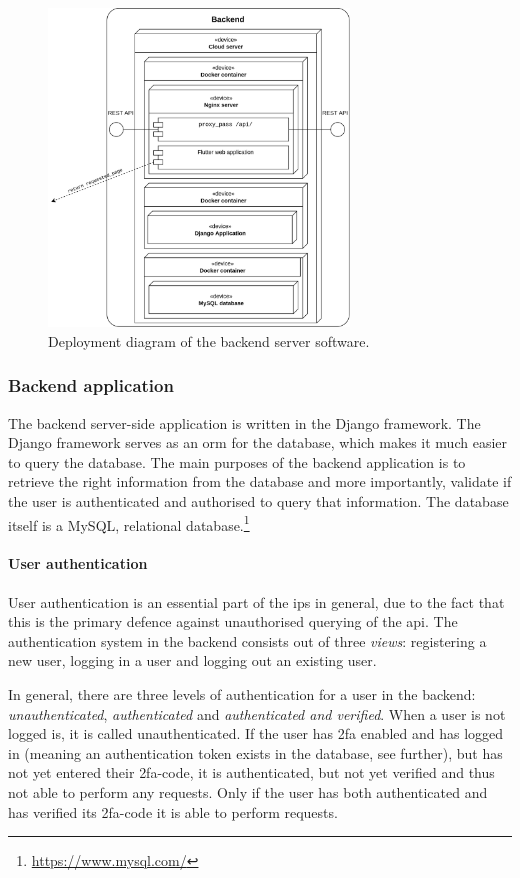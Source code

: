 \begin{figure}[htp]
    \centering
    \includegraphics[width=8cm]{images/deployment_diagrams/deployment_diagram-backend.drawio.png}
    \caption{Deployment diagram of the backend server software.}
    \label{fig:deployment-backend}
\end{figure}


\subsubsection{Backend application}\label{sec:backend-application}
The backend server-side application is written in the Django framework. The Django framework serves as an \ac{orm} for the database, which makes it much easier to query the database. The main purposes of the backend application is to retrieve the right information from the database and more importantly, validate if the user is authenticated and authorised to query that information. The database itself is a MySQL, relational database.\footnote{\url{https://www.mysql.com/}} 


\paragraph{User authentication}\label{sec:user-authentication}
User authentication is an essential part of the \ac{ips} in general, due to the fact that this is the primary defence against unauthorised querying of the \ac{api}. The authentication system in the backend consists out of three \textit{views}: registering a new user, logging in a user and logging out an existing user. 

\ind In general, there are three levels of authentication for a user in the backend: \textit{unauthenticated}, \textit{authenticated} and \textit{authenticated and verified}. When a user is not logged is, it is called unauthenticated. If the user has \ac{2fa} enabled and has logged in (meaning an authentication token exists in the database, see further), but has not yet entered their \ac{2fa}-code, it is authenticated, but not yet verified and thus not able to perform any requests. Only if the user has both authenticated and has verified its \ac{2fa}-code it is able to perform requests.

